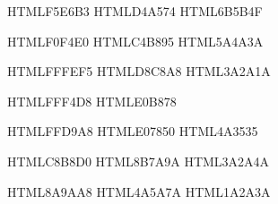 

\definecolor{DawnKey}       {HTML}{F5E6B3}  %
\definecolor{DawnMid}       {HTML}{D4A574}  %
\definecolor{DawnShade}     {HTML}{6B5B4F}  %

\definecolor{MorningKey}    {HTML}{F0F4E0}  %
\definecolor{MorningMid}    {HTML}{C4B895}  %
\definecolor{MorningShade}  {HTML}{5A4A3A}  %

\definecolor{NoonKey}       {HTML}{FFFEF5}  %
\definecolor{NoonMid}       {HTML}{D8C8A8}  %
\definecolor{NoonShade}     {HTML}{3A2A1A}  %

\definecolor{AfternoonKey}  {HTML}{FFF4D8}  %
\definecolor{AfternoonMid}  {HTML}{E0B878}  %

\definecolor{SunsetKey}     {HTML}{FFD9A8}  %
\definecolor{SunsetMid}     {HTML}{E07850}  %
\definecolor{SunsetShade}   {HTML}{4A3535}  %

\definecolor{DuskKey}       {HTML}{C8B8D0}  %
\definecolor{DuskMid}       {HTML}{8B7A9A}  %
\definecolor{DuskShade}     {HTML}{3A2A4A}  %

\definecolor{NightKey}      {HTML}{8A9AA8}  %
\definecolor{NightMid}      {HTML}{4A5A7A}  %
\definecolor{NightShade}    {HTML}{1A2A3A}  %

%
%
%
%
%

